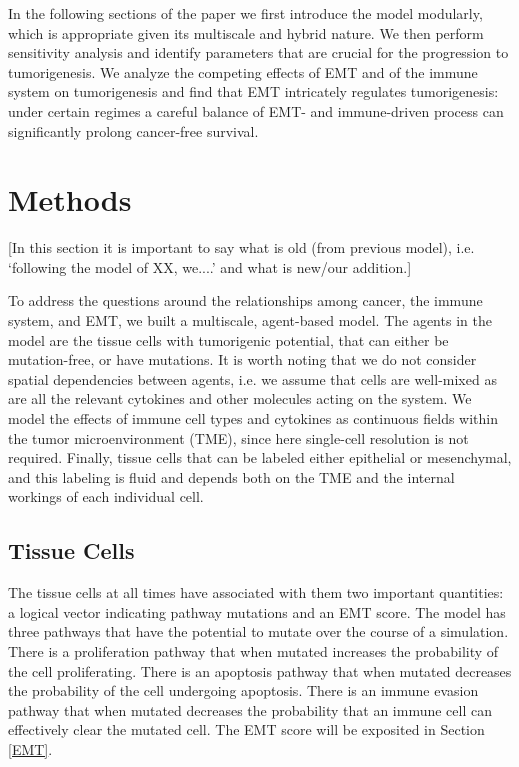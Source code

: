 \documentclass{article}
\begin{document}
In the following sections of the paper we first introduce the model modularly, which is appropriate given its multiscale and hybrid nature.
We then perform sensitivity analysis and identify parameters that are crucial for the progression to tumorigenesis.
We analyze the competing effects of EMT and of the immune system on tumorigenesis and find that EMT intricately regulates tumorigenesis: under certain regimes a careful balance of EMT- and immune-driven process can significantly prolong cancer-free survival.   





\section{Methods}
[In this section it is important to say what is old (from previous model), i.e. `following the model of XX, we....' and what is new/our addition.]

To address the questions around the relationships among cancer, the immune system, and EMT, we built a multiscale, agent-based model.
The agents in the model are the tissue cells with tumorigenic potential, that can either be mutation-free, or have mutations.
It is worth noting that we do not consider spatial dependencies between agents, i.e. we assume that cells are well-mixed as are all the relevant cytokines and other molecules acting on the system.
We model the effects of immune cell types and cytokines as continuous fields within the tumor microenvironment (TME), since here single-cell resolution is not required. 
Finally, tissue cells that can be labeled either epithelial or mesenchymal, and this labeling is fluid and depends both on the TME and the internal workings of each individual cell.

\subsection{Tissue Cells}\label{TissueCells}
The tissue cells at all times have associated with them two important quantities: a logical vector indicating pathway mutations and an EMT score.
The model has three pathways that have the potential to mutate over the course of a simulation.
There is a proliferation pathway that when mutated increases the probability of the cell proliferating.
There is an apoptosis pathway that when mutated decreases the probability of the cell undergoing apoptosis.
There is an immune evasion pathway that when mutated decreases the probability that an immune cell can effectively clear the mutated cell.
The EMT score will be exposited in Section \ref{EMT}.
\end{document}
